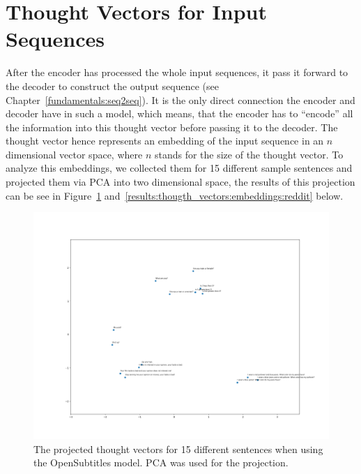 \section{Thought Vectors for Input Sequences}
After the encoder has processed the whole input sequences, it pass it forward to the decoder to construct the output sequence (see Chapter~\ref{fundamentals:seq2seq}). It is the only direct connection the encoder and decoder have in such a model, which means, that the encoder has to ``encode'' all the information into this thought vector before passing it to the decoder. The thought vector hence represents an embedding of the input sequence in an $n$ dimensional vector space, where $n$ stands for the size of the thought vector. To analyze this embeddings, we collected them for 15 different sample sentences and projected them via PCA into two dimensional space, the results of this projection can be see in Figure~\ref{results:thougth_vectors:embeddings:opensubtitles} and~\ref{results:thougth_vectors:embeddings:reddit} below.

\begin{figure}[H]
	\centering
	\includegraphics[width=16cm]{img/opensubtitles_thought_vector_embeddings.png}
	\caption{The projected thought vectors for 15 different sentences when using the OpenSubtitles model. PCA was used for the projection.}
	\label{results:thougth_vectors:embeddings:opensubtitles}
\end{figure}

